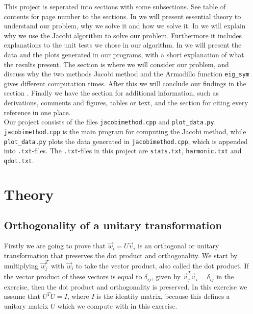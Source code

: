 \documentclass{article}
\begin{document}
This project is seperated into sections with some subsections. See table of contents for page number to the sections. In  we will present essential theory to understand our problem, why we solve it and how we solve it. In  we will explain why we use the Jacobi algorithm to solve our problem. Furthermore it includes explanations to the unit tests we chose in our algorithm.
In  we will present the data and the plots generated in our programs, with a short explanation of what the results present. The section  is where we will consider our problem, and discuss why the two methods Jacobi method and the Armadillo function \texttt{eig\_sym} gives different computation times. After this we will conclude our findings in the section .
Finally we have the section  for additional information, such as derivations, comments and figures, tables or text, and the section  for citing every reference in one place. \\

Our project consists of the files \texttt{jacobimethod.cpp} and \texttt{plot\_data.py}. \texttt{jacobimethod.cpp} is the main program for computing the Jacobi method, while \texttt{plot\_data.py} plots the data generated in \texttt{jacobimethod.cpp}, which is appended into \texttt{.txt}-files. The \texttt{.txt}-files in this project are \texttt{stats.txt}, \texttt{harmonic.txt} and \texttt{qdot.txt}.  \\


\vspace{1cm}

\section{Theory} \label{sec:Theory}

\subsection{Orthogonality of a unitary transformation} \label{sec:orthogonality}

Firstly we are going to prove that $\vec{w}_i = U \vec{v}_i$ is an orthogonal or unitary transformation that preserves the dot product and orthogonality. We start by multiplying $\vec{w}_j ^T$ with $\vec{w}_i$ to take the vector product, also called the dot product. If the vector product of these vectors is equal to $\delta_{ij}$, given by $\vec{v}_j ^T \vec{v}_i = \delta_{ij}$ in the exercise, then the dot product and orthogonality is preserved. In this exercise we assume that $U^T U = I$, where $I$ is the identity matrix, because this defines a unitary matrix $U$ which we compute with in this exercise. \\
\end{document}
